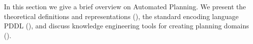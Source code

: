 In this section we give a brief overview on Automated Planning.
We present the theoretical definitions and representations (), the standard encoding language PDDL (), and discuss knowledge engineering tools for creating planning domains ().



%